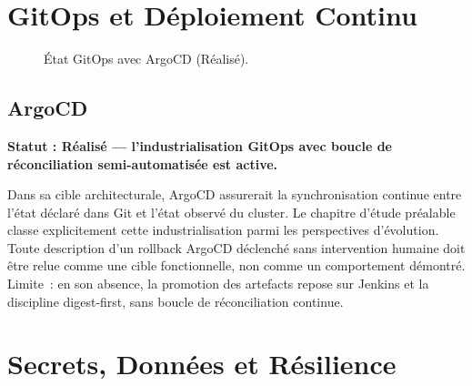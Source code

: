 \section{GitOps et Déploiement Continu}
\label{sec:gitops}

\begin{figure}[htbp]
\centering
\scriptsize
{}
\caption{État GitOps avec ArgoCD (Réalisé).}
\label{fig:gitops_actuel_cible}
\end{figure}

\subsection{ArgoCD}
\textbf{Statut : Réalisé — l'industrialisation GitOps avec boucle de réconciliation semi-automatisée est active.}

Dans sa cible architecturale, ArgoCD assurerait la synchronisation continue entre l'état déclaré dans Git et l'état observé du cluster. Le chapitre d'étude préalable classe explicitement cette industrialisation parmi les perspectives d'évolution. Toute description d'un rollback ArgoCD déclenché sans intervention humaine doit être relue comme une cible fonctionnelle, non comme un comportement démontré. Limite~: en son absence, la promotion des artefacts repose sur Jenkins et la discipline digest-first, sans boucle de réconciliation continue.

\section{Secrets, Données et Résilience}

